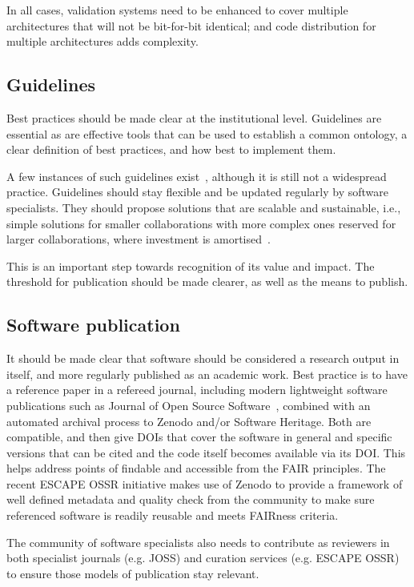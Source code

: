 In all cases, validation systems need to be enhanced to cover multiple architectures that will not be bit-for-bit identical; and code distribution for multiple architectures adds complexity.

\subsection{Guidelines}

Best practices should be made clear at the institutional level. Guidelines are essential as are effective tools that can be used to establish a common ontology, a clear definition of best practices, and how best to implement them. 

A few instances of such guidelines exist~\cite{RSQkit}, although it is still not a widespread practice. Guidelines should stay flexible and be updated regularly by software specialists. They should propose solutions that are scalable and sustainable, i.e., simple solutions for smaller collaborations with more complex ones reserved for larger collaborations, where investment is amortised~\cite{australian_research_data_commons_2022_6378082}.

This is an important step towards recognition of its value and impact. The threshold for publication should be made clearer, as well as the means to publish.


\subsection{Software publication}

It should be made clear that software should be considered a research output in itself, and more regularly published as an academic work. Best practice is to have a reference paper in a refereed journal, including modern lightweight software publications such as Journal of Open Source Software~\cite{JOSS}, combined with an automated archival process to Zenodo and/or Software Heritage. Both are compatible, and then give DOIs that cover the software in general and specific versions that can be cited and the code itself becomes available via its DOI. This helps address points of findable and accessible from the FAIR principles. The recent ESCAPE OSSR initiative makes use of Zenodo to provide a framework of well defined metadata and quality check from the community to make sure referenced software is readily reusable and meets FAIRness criteria.

The community of software specialists also needs to contribute as reviewers in both specialist journals (e.g. JOSS) and curation services (e.g. ESCAPE OSSR) to ensure those models of publication stay relevant.


